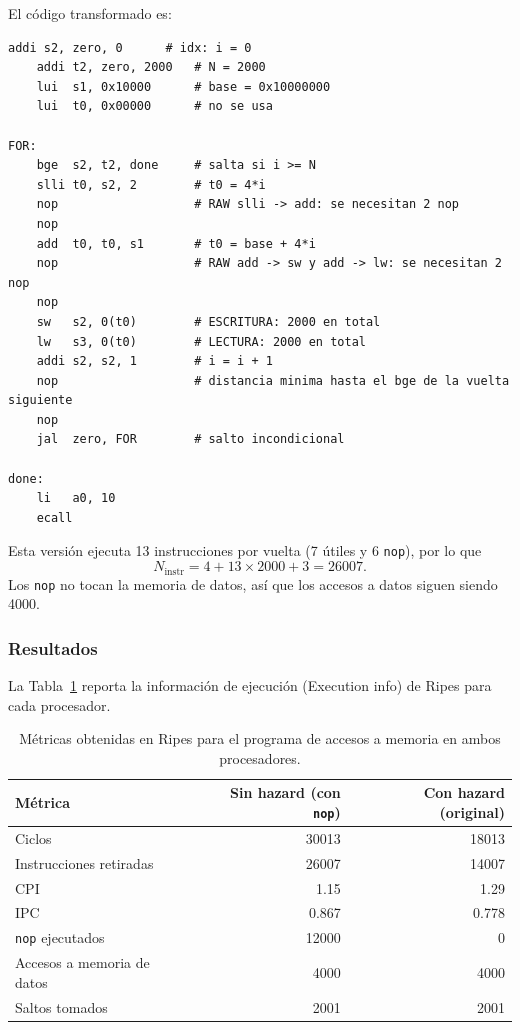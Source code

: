 \documentclass[11pt,a4paper]{article}
\begin{document}
El c\'odigo transformado es:

\begin{lstlisting}[style=asm,caption={Versi\'on con \texttt{nop} para el procesador sin forwarding ni detecci\'on de hazards.},label={lst:nops}]
    addi s2, zero, 0      # idx: i = 0
    addi t2, zero, 2000   # N = 2000
    lui  s1, 0x10000      # base = 0x10000000
    lui  t0, 0x00000      # no se usa

FOR:
    bge  s2, t2, done     # salta si i >= N
    slli t0, s2, 2        # t0 = 4*i
    nop                   # RAW slli -> add: se necesitan 2 nop
    nop
    add  t0, t0, s1       # t0 = base + 4*i
    nop                   # RAW add -> sw y add -> lw: se necesitan 2 nop
    nop
    sw   s2, 0(t0)        # ESCRITURA: 2000 en total
    lw   s3, 0(t0)        # LECTURA: 2000 en total
    addi s2, s2, 1        # i = i + 1
    nop                   # distancia minima hasta el bge de la vuelta siguiente
    nop
    jal  zero, FOR        # salto incondicional

done:
    li   a0, 10
    ecall
\end{lstlisting}

Esta versi\'on ejecuta 13 instrucciones por vuelta (7 \'utiles y 6
\texttt{nop}), por lo que
\begin{equation}
  N_{\text{instr}} = 4 + 13 \times 2000 + 3 = 26007 .
\end{equation}
Los \texttt{nop} no tocan la memoria de datos, as\'i que los accesos a datos
siguen siendo 4000.

\subsubsection{Resultados}
\label{sec:resultados}

La Tabla~\ref{tab:resultados} reporta la informaci\'on de ejecuci\'on (Execution
info) de Ripes para cada procesador.

\begin{table}[h]
  \centering
  \begin{tabular}{@{}lrr@{}}
    \toprule
    M\'etrica & Sin hazard (con \texttt{nop}) & Con hazard (original) \\
    \midrule
    Ciclos                          & 30013  & 18013  \\
    Instrucciones retiradas         & 26007  & 14007  \\
    CPI                             & 1.15   & 1.29   \\
    IPC                             & 0.867  & 0.778  \\
    \texttt{nop} ejecutados         & 12000  & 0      \\
    Accesos a memoria de datos      & 4000   & 4000   \\
    Saltos tomados                  & 2001   & 2001   \\
    \bottomrule
  \end{tabular}
  \caption{M\'etricas obtenidas en Ripes para el programa de accesos a memoria en ambos procesadores.}
  \label{tab:resultados}
\end{table}
\end{document}
